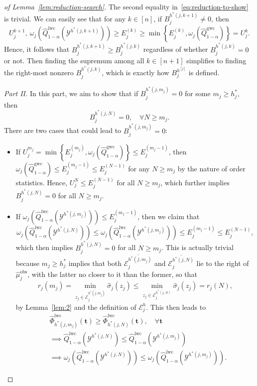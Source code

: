 \begin{proof}[of Lemma~\ref{lem:reduction-search}]
The second equality in~\eqref{eq:reduction-to-show}
is trivial. We can easily see that for any $k \in [n]$, if $B^{h^*(j,k+1)}_j \neq 0$, then
\[
U^{k+1}_j,\ \omega_j(\hat{Q}^{\mathrm{lwc}}_{1-\alpha}(\mathcal{Y}^{h^*(j,k+1)})) \geq E^{(k)}_j \geq \min\left\{E^{(k)}_j, \omega_j(\hat{Q}^{\mathrm{gwc}}_{1-\alpha})\right\} = U^k_j.
\]
Hence, it follows that $B^{h^*(j,k+1)}_j \geq B^{h^*(j,k)}_j$ regardless of whether $B^{h^*(j,k)}_j = 0$ or not. Then finding the supremum among all $k\in [n+1]$ simplifies to finding the right-most nonzero $B_j^{h^*(j,k)}$, which is exactly how $B^{h^{[j]}}_j$ is defined.

\textit{Part II.} In this part, we aim to show that if $B_j^{h^*(j,m_j)} =0$ for some $m_j \geq h^*_j$, then
\[
B_j^{h^*(j,N)} = 0, \quad \forall N\geq m_j.
\]
There are two cases that could lead to $B_j^{h^*(j,m_j)} =0$:
    \begin{itemize}
        \item If $U^{m_j}_j = \min\left\{E^{(m_j)}_j,\omega_j(\hat{Q}^{\mathrm{gwc}}_{1-\alpha})\right\} \leq E^{(m_j-1)}_j$, then $\omega_j(\hat{Q}^\mathrm{gwc}_{1-\alpha}) \leq E^{(m_j-1)}_j \leq E^{(N-1)}_j$ for any $N\geq m_j$ by the nature of order statistics. Hence, $U^N_j \leq E^{(N-1)}_j$ for all $N\geq m_j$, which further implies $B_j^{h^*(j,N)} = 0$ for all $N\geq m_j$.
        \item If $\omega_j(\hat{Q}^\mathrm{lwc}_{1-\alpha} (\mathcal{Y}^{h^*(j,m_j)})) \leq E^{(m_j-1)}_j$, then we claim that
        \[
        \omega_j(\hat{Q}^\mathrm{lwc}_{1-\alpha} (\mathcal{Y}^{h^*(j,N)})) \leq \omega_j(\hat{Q}^\mathrm{lwc}_{1-\alpha} (\mathcal{Y}^{h^*(j,m_j)})) \leq E^{(m_j-1)}_j \leq E^{(N-1)}_j,
        \]
        which then implies $B_j^{h^*(j,N)} =0$ for all $N\geq m_j$.
        This is actually trivial because $m_j \geq h^*_j$ implies that both $\overline{\mathcal{E}^{h^*(j,m_j)}_j}$ and $\overline{\mathcal{E}^{h^*(j,N)}_j}$ lie to the right of $\hat{\mu}^\mathrm{obs}_j$, with the latter no closer to it than the former, so that
        \[
        r_j(m_j) = \min_{z_j \in \overline{\mathcal{E}^{h^*(j, m_j)}_j}} \hat{\sigma}_j(z_j) \leq \min_{z_j \in \overline{\mathcal{E}^{h^*(j,N)}_j}} \hat{\sigma}_j(z_j) = r_j(N),
        \]
        by Lemma~\ref{lem:2} and the definition of $\mathcal{E}^h_j$. This then leads to
        \begin{align*}
            &\hat{\Phi}^{\mathrm{lwc}}_{h^*(j, m_j)}(\mathbf t) \geq \hat{\Phi}^{\mathrm{lwc}}_{h^*(j,N)}(\mathbf t), \quad \forall \mathbf t\\
            &\implies \hat{Q}^\mathrm{lwc}_{1-\alpha} (\mathcal{Y}^{h^*(j,N)}) \leq \hat{Q}^\mathrm{lwc}_{1-\alpha}(\mathcal{Y}^{h^*(j, m_j)})\\
            &\implies \omega_j(\hat{Q}^\mathrm{lwc}_{1-\alpha} (\mathcal{Y}^{h^*(j,N)})) \leq \omega_j(\hat{Q}^\mathrm{lwc}_{1-\alpha} (\mathcal{Y}^{h^*(j,m_j)})).
        \end{align*}
    \end{itemize}
\end{proof}


\clearpage



